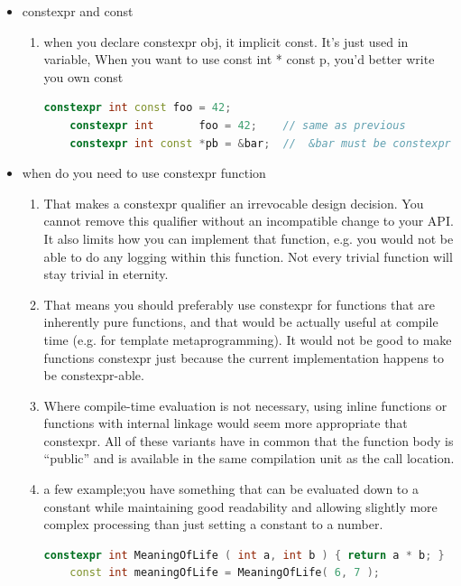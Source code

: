 \documentclass[a4paper,12pt,twoside]{book}
\begin{document}
\begin{itemize}
\item constexpr and const
\begin{enumerate}
    \item when you declare constexpr obj, it implicit const. It's just used in variable, When you want to use const int * const p, you'd better write you own const 
\begin{lstlisting}[frame=single, language=c++]
    constexpr int const foo = 42;
    constexpr int       foo = 42;    // same as previous
    constexpr int const *pb = &bar;  //  &bar must be constexpr
\end{lstlisting}

\end{enumerate}

\item when do you need to use constexpr function

\begin{enumerate}
    \item That makes a constexpr qualifier an irrevocable design decision. You cannot remove this qualifier without an incompatible change to your API. It also limits how you can implement that function, e.g. you would not be able to do any logging within this function. Not every trivial function will stay trivial in eternity.
    
    \item That means you should preferably use constexpr for functions that are inherently pure functions, and that would be actually useful at compile time (e.g. for template metaprogramming). It would not be good to make functions constexpr just because the current implementation happens to be constexpr-able.
    
    \item Where compile-time evaluation is not necessary, using inline functions or functions with internal linkage would seem more appropriate that constexpr. All of these variants have in common that the function body is “public” and is available in the same compilation unit as the call location.
    
    \item a few example;you have something that can be evaluated down to a constant while maintaining good readability and allowing slightly more complex processing than just setting a constant to a number.
    \begin{lstlisting}[frame=single, language=c++]
    constexpr int MeaningOfLife ( int a, int b ) { return a * b; }
    const int meaningOfLife = MeaningOfLife( 6, 7 );
\end{lstlisting}
    

\end{enumerate}
\end{itemize}
\end{document}
